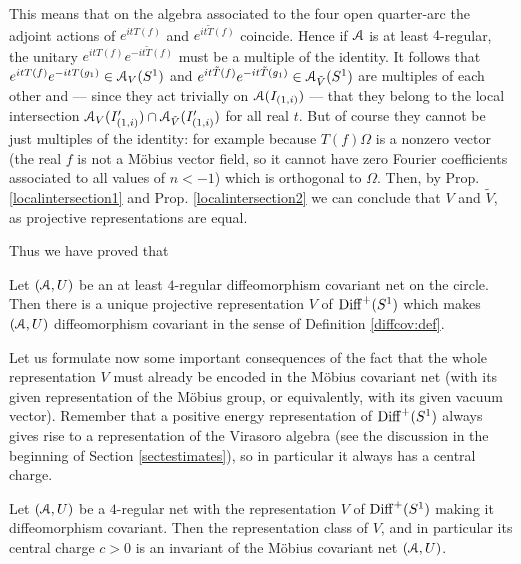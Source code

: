 \documentclass[12pt]{article}
\begin{document}
This means that on the algebra associated to the 
four open quarter-arc the adjoint actions of
$e^{itT(f)}$ and $e^{it\tilde{T}(f)}$ coincide. 
Hence if ${\mathcal A}$ is at least $4$-regular, the unitary
$e^{itT(f)}e^{-it\tilde{T}(f)}$ must be a multiple of the identity. 
It follows that $e^{itT(f)}e^{-itT(g_1)} \in {\mathcal A}_V(S^1)$
and $e^{it\tilde{T}(f)}e^{-it\tilde{T}(g_1)} \in {\mathcal A}_{\tilde{V}}(S^1)$ 
are multiples of each other and --- since they act trivially on
${\mathcal A}(I_{(1,i)})$ --- that they belong to the local intersection
${\mathcal A}_V(I_{(1,i)}') \cap {\mathcal A}_{\tilde{V}}(I_{(1,i)}')$ for all real $t$. 
But of course they cannot be just multiples of the identity: for example
because $T(f)\Omega$ is a nonzero vector (the real $f$ is not a
M\"obius vector field, so it cannot have zero Fourier coefficients
associated to all values of $n < -1$) which is orthogonal to $\Omega$.
Then, by Prop. \ref{localintersection1} and Prop.
\ref{localintersection2} we can conclude that $V$ and $\tilde{V}$, as
projective representations are equal.

Thus we have proved that
\begin{theorem}
\label{uniq4-reg} 
Let $({\mathcal A},U)$ be an at least $4$-regular diffeomorphism
covariant net on the circle. Then there is a unique 
projective representation $V$ of ${{\rm Diff}^+(S^1)}$  
which makes $({\mathcal A},U)$ diffeomorphism covariant
in the sense of Definition \ref{diffcov:def}.
\end{theorem}

Let us formulate now some important consequences of the fact that the
whole representation $V$ must already be encoded in the M\"obius covariant
net (with its given representation of the M\"obius group, or
equivalently,
with its given vacuum vector). Remember that a positive energy
representation of ${{\rm Diff}^+(S^1)}$ always gives rise to a representation of the 
Virasoro algebra
(see the discussion in the beginning of Section \ref{sectestimates}), so
in particular it always has a central charge.
\begin{corollary}
\label{invariants}
Let $({\mathcal A},U)$ be a $4$-regular net with the representation
$V$ of ${{\rm Diff}^+(S^1)}$ making it diffeomorphism covariant. Then the
representation class of $V$, and in particular its central charge
$c>0$ is an invariant of the M\"obius covariant net $({\mathcal A},U)$.
\end{corollary}
\end{document}
